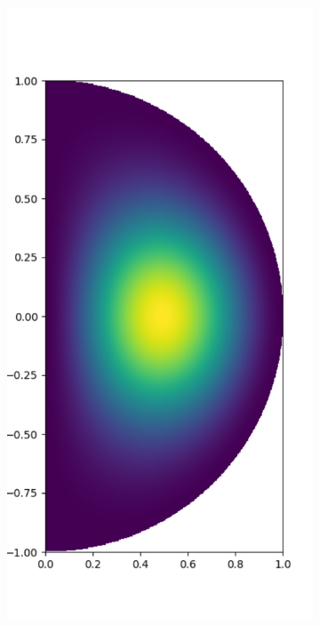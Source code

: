 \documentclass[11pt, oneside]{article}   	%
\begin{document}
\begin{figure}[t]
	\begin{subfigure}{0.3\textwidth}
	\centering
	\includegraphics[scale=0.3]{solution-biharmonic}
	\end{subfigure}

\end{figure}
\end{document}
